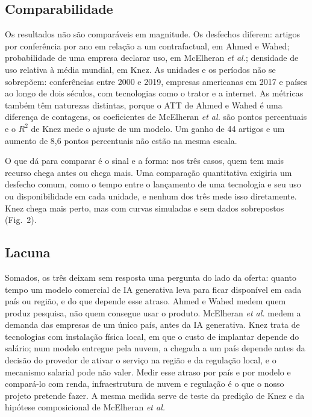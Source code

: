 \subsection*{Comparabilidade}
Os resultados não são comparáveis em magnitude. Os desfechos diferem: artigos por conferência por
ano em relação a um contrafactual, em Ahmed e Wahed; probabilidade de uma empresa declarar uso, em
McElheran \emph{et al.}; densidade de uso relativa à média mundial, em Knez. As unidades e os
períodos não se sobrepõem: conferências entre 2000 e 2019, empresas americanas em 2017 e países ao
longo de dois séculos, com tecnologias como o trator e a internet. As métricas também têm naturezas
distintas, porque o ATT de Ahmed e Wahed é uma diferença de contagens, os coeficientes de McElheran
\emph{et al.} são pontos percentuais e o $R^2$ de Knez mede o ajuste de um modelo. Um ganho de 44
artigos e um aumento de 8,6 pontos percentuais não estão na mesma escala.

O que dá para comparar é o sinal e a forma: nos três casos, quem tem mais recurso chega antes ou
chega mais. Uma comparação quantitativa exigiria um desfecho comum, como o tempo entre o lançamento
de uma tecnologia e seu uso ou disponibilidade em cada unidade, e nenhum dos três mede isso
diretamente. Knez chega mais perto, mas com curvas simuladas e sem dados sobrepostos (Fig.~2).

\subsection*{Lacuna}
Somados, os três deixam sem resposta uma pergunta do lado da oferta: quanto tempo um modelo
comercial de IA generativa leva para ficar disponível em cada país ou região, e do que depende
esse atraso. Ahmed e Wahed medem quem produz pesquisa, não quem consegue usar o produto. McElheran
\emph{et al.} medem a demanda das empresas de um único país, antes da IA generativa. Knez trata de
tecnologias com instalação física local, em que o custo de implantar depende do salário; num
modelo entregue pela nuvem, a chegada a um país depende antes da decisão do provedor de ativar o
serviço na região e da regulação local, e o mecanismo salarial pode não valer. Medir esse atraso
por país e por modelo e compará-lo com renda, infraestrutura de nuvem e regulação é o que o nosso
projeto pretende fazer. A mesma medida serve de teste da predição de Knez e da hipótese
composicional de McElheran \emph{et al.}
